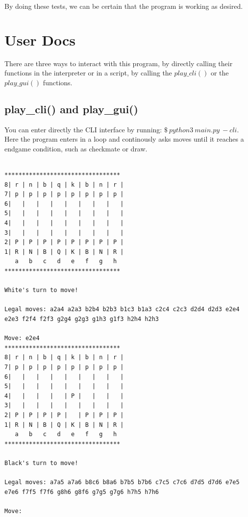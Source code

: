 \documentclass[10pt]{article}
\begin{document}
\begin{lstlisting}
\end{lstlisting}

By doing these tests, we can be certain that the program is working as desired.


\pagebreak
\section{User Docs}

There are three ways to interact with this program, by directly calling their
functions in the interpreter or in a script, by calling the $play\_cli()$ or the
$play\_gui()$ functions. 

\subsection{play\_cli() and play\_gui()}

You can enter directly the CLI interface by running: $\$~python3~main.py~-cli$.
Here the program enters in a loop and continously asks moves until it reaches a
endgame condition, such as checkmate or draw.

\begin{lstlisting}

*********************************
8| r | n | b | q | k | b | n | r |
7| p | p | p | p | p | p | p | p |
6|   |   |   |   |   |   |   |   |
5|   |   |   |   |   |   |   |   |
4|   |   |   |   |   |   |   |   |
3|   |   |   |   |   |   |   |   |
2| P | P | P | P | P | P | P | P |
1| R | N | B | Q | K | B | N | R |
   a   b   c   d   e   f   g   h
*********************************

White's turn to move!

Legal moves: a2a4 a2a3 b2b4 b2b3 b1c3 b1a3 c2c4 c2c3 d2d4 d2d3 e2e4 e2e3 f2f4 f2f3 g2g4 g2g3 g1h3 g1f3 h2h4 h2h3

Move: e2e4
*********************************
8| r | n | b | q | k | b | n | r |
7| p | p | p | p | p | p | p | p |
6|   |   |   |   |   |   |   |   |
5|   |   |   |   |   |   |   |   |
4|   |   |   |   | P |   |   |   |
3|   |   |   |   |   |   |   |   |
2| P | P | P | P |   | P | P | P |
1| R | N | B | Q | K | B | N | R |
   a   b   c   d   e   f   g   h
*********************************

Black's turn to move!

Legal moves: a7a5 a7a6 b8c6 b8a6 b7b5 b7b6 c7c5 c7c6 d7d5 d7d6 e7e5 e7e6 f7f5 f7f6 g8h6 g8f6 g7g5 g7g6 h7h5 h7h6

Move:

\end{lstlisting}
\end{document}
